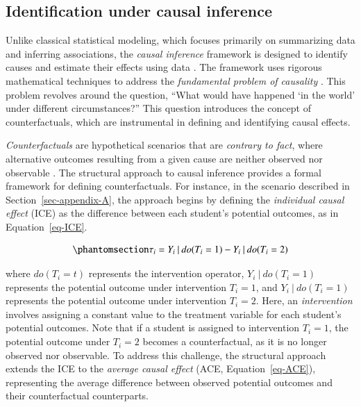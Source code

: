 \documentclass[
  authoryear,
  review,
  1p]{elsarticle}
\begin{document}
\subsection{Identification under causal inference}\label{sec-appendix-B}

Unlike classical statistical modeling, which focuses primarily on
summarizing data and inferring associations, the \emph{causal inference}
framework is designed to identify causes and estimate their effects
using data \citep{Shaughnessy_et_al_2010, Neal_2020}. The framework uses
rigorous mathematical techniques to address the \emph{fundamental
problem of causality}
\citep{Pearl_2009, Pearl_et_al_2016, Morgan_et_al_2014}. This problem
revolves around the question, ``What would have happened `in the world'
under different circumstances?'' This question introduces the concept of
counterfactuals, which are instrumental in defining and identifying
causal effects.

\emph{Counterfactuals} are hypothetical scenarios that are
\emph{contrary to fact}, where alternative outcomes resulting from a
given cause are neither observed nor observable
\citep{Neal_2020, Counterfactual_2024}. The structural approach to
causal inference \citep{Pearl_2009, Pearl_et_al_2016} provides a formal
framework for defining counterfactuals. For instance, in the scenario
described in Section~\ref{sec-appendix-A}, the approach begins by
defining the \emph{individual causal effect} (ICE) as the difference
between each student's potential outcomes, as in Equation~\ref{eq-ICE}.

\begin{equation}\phantomsection\label{eq-ICE}{
\tau_{i} = Y_{i} \:|\:do(T_{i}=1) - Y_{i} \:|\:do(T_{i}=2)
}\end{equation}

where \(do(T_{i}=t)\) represents the intervention operator,
\(Y_{i} \:|\:do(T_{i}=1)\) represents the potential outcome under
intervention \(T_{i}=1\), and \(Y_{i} \:|\:do(T_{i}=1)\) represents the
potential outcome under intervention \(T_{i}=2\). Here, an
\emph{intervention} involves assigning a constant value to the treatment
variable for each student's potential outcomes. Note that if a student
is assigned to intervention \(T_{i}=1\), the potential outcome under
\(T_{i}=2\) becomes a counterfactual, as it is no longer observed nor
observable. To address this challenge, the structural approach extends
the ICE to the \emph{average causal effect} (ACE,
Equation~\ref{eq-ACE}), representing the average difference between
observed potential outcomes and their counterfactual counterparts.
\end{document}
